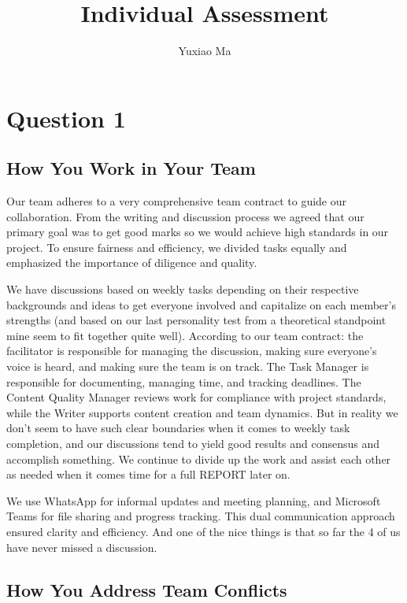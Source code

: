 \documentclass[UTF8,a4paper,AutoFakeBold,AutoFakeSlant]{article}
\title{\vspace{-1.5cm}\textbf{\textsf{{\textsf{Individual Assessment}}}}}
\author{\tnewroman Yuxiao Ma}
\date{}
\begin{document}
\maketitle


\section{Question 1}

\subsection{How You Work in Your Team}


Our team adheres to a very comprehensive team contract to guide our collaboration. From the writing and discussion process we agreed that our primary goal was to get good marks so we would achieve high standards in our project. To ensure fairness and efficiency, we divided tasks equally and emphasized the importance of diligence and quality.

We have discussions based on weekly tasks depending on their respective backgrounds and ideas to get everyone involved and capitalize on each member's strengths (and based on our last personality test from a theoretical standpoint mine seem to fit together quite well). According to our team contract: the facilitator is responsible for managing the discussion, making sure everyone's voice is heard, and making sure the team is on track. The Task Manager is responsible for documenting, managing time, and tracking deadlines. The Content Quality Manager reviews work for compliance with project standards, while the Writer supports content creation and team dynamics. But in reality we don't seem to have such clear boundaries when it comes to weekly task completion, and our discussions tend to yield good results and consensus and accomplish something. We continue to divide up the work and assist each other as needed when it comes time for a full REPORT later on.

We use WhatsApp for informal updates and meeting planning, and Microsoft Teams for file sharing and progress tracking. This dual communication approach ensured clarity and efficiency. And one of the nice things is that so far the 4 of us have never missed a discussion.


\subsection{How You Address Team Conflicts}
\end{document}
